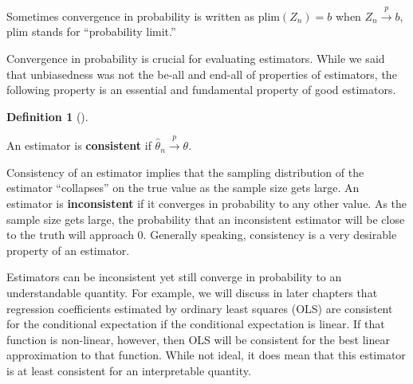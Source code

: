 \documentclass[
  letterpaper,
  DIV=11,
  numbers=noendperiod]{scrreprt}
\newcommand{\inprob}{\overset{p}{\to}}
\theoremstyle{definition}
\theoremstyle{definition}
\newtheorem{definition}{Definition}[chapter]
\theoremstyle{plain}
\theoremstyle{remark}
\begin{document}
\begin{tcolorbox}[enhanced jigsaw, colbacktitle=quarto-callout-note-color!10!white, breakable, toptitle=1mm, opacityback=0, leftrule=.75mm, rightrule=.15mm, coltitle=black, opacitybacktitle=0.6, toprule=.15mm, arc=.35mm, bottomtitle=1mm, titlerule=0mm, title=\textcolor{quarto-callout-note-color}{\faInfo}\hspace{0.5em}{Notation alert}, colframe=quarto-callout-note-color-frame, bottomrule=.15mm, colback=white, left=2mm]

Sometimes convergence in probability is written as
\(\text{plim}(Z_n) = b\) when \(Z_n \inprob b\), \(\text{plim}\) stands
for ``probability limit.''

\end{tcolorbox}

Convergence in probability is crucial for evaluating estimators. While
we said that unbiasedness was not the be-all and end-all of properties
of estimators, the following property is an essential and fundamental
property of good estimators.

\begin{definition}[]\protect\hypertarget{def-consistency}{}\label{def-consistency}

An estimator is \textbf{consistent} if
\(\widehat{\theta}_n \inprob \theta\).

\end{definition}

Consistency of an estimator implies that the sampling distribution of
the estimator ``collapses'' on the true value as the sample size gets
large. An estimator is \textbf{inconsistent} if it converges in
probability to any other value. As the sample size gets large, the
probability that an inconsistent estimator will be close to the truth
will approach 0. Generally speaking, consistency is a very desirable
property of an estimator.

\begin{tcolorbox}[enhanced jigsaw, colbacktitle=quarto-callout-note-color!10!white, breakable, toptitle=1mm, opacityback=0, leftrule=.75mm, rightrule=.15mm, coltitle=black, opacitybacktitle=0.6, toprule=.15mm, arc=.35mm, bottomtitle=1mm, titlerule=0mm, title=\textcolor{quarto-callout-note-color}{\faInfo}\hspace{0.5em}{Note}, colframe=quarto-callout-note-color-frame, bottomrule=.15mm, colback=white, left=2mm]

Estimators can be inconsistent yet still converge in probability to an
understandable quantity. For example, we will discuss in later chapters
that regression coefficients estimated by ordinary least squares (OLS)
are consistent for the conditional expectation if the conditional
expectation is linear. If that function is non-linear, however, then OLS
will be consistent for the best linear approximation to that function.
While not ideal, it does mean that this estimator is at least consistent
for an interpretable quantity.

\end{tcolorbox}
\end{document}
